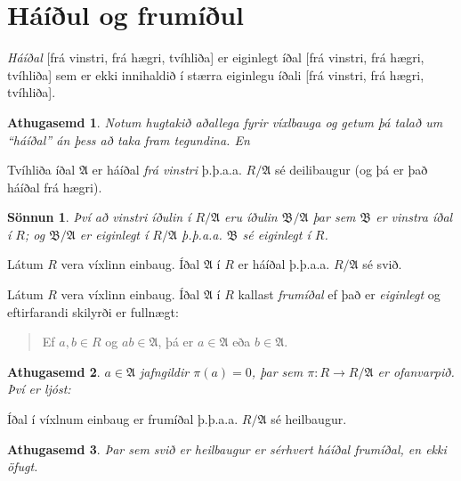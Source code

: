 \documentclass[a4paper,icelandic,11pt]{book}
\theoremstyle{plain}
\newtheorem*{ath}{Athugasemd}
\newtheorem*{sonnun}{Sönnun}
\begin{document}
\section{Háíðul og frumíðul}
\begin{skilgr}
  \emph{Háíðal}
  [frá vinstri, frá hægri, tvíhliða] er eiginlegt
  íðal [frá vinstri, frá hægri, tvíhliða] sem er ekki innihaldið í stærra
  eiginlegu íðali [frá vinstri, frá hægri, tvíhliða].
\end{skilgr}
\begin{ath}
  Notum hugtakið aðallega fyrir víxlbauga og getum þá talað um "`háíðal"' án
  þess að taka fram tegundina. En
\end{ath}
\begin{setn}
  Tvíhliða íðal $\mathfrak A$ er háíðal \emph{frá vinstri} þ.þ.a.a. $R/\mathfrak
  A$ sé deilibaugur (og þá er það háíðal frá hægri).
\end{setn}
\begin{sonnun}
  Því að vinstri íðulin í $R/\mathfrak A$ eru íðulin $\mathfrak B/\mathfrak A$
  þar sem $\mathfrak B$ er vinstra íðal í $R$; og $\mathfrak B/\mathfrak A$ er
  eiginlegt í $R /\mathfrak A$ þ.þ.a.a. $\mathfrak B$ sé eiginlegt í $R$.
\end{sonnun}
\begin{fylgisetn}
  Látum $R$ vera víxlinn einbaug. Íðal $\mathfrak A$ í $R$ er háíðal þ.þ.a.a.
  $R/\mathfrak A$ sé svið.
\end{fylgisetn}
\begin{skilgr}
  Látum $R$ vera víxlinn einbaug. Íðal $\mathfrak A$ í $R$ kallast
  \emph{frumíðal} ef það er
  \emph{eiginlegt} og eftirfarandi skilyrði er fullnægt:
  \begin{quote}
    Ef $a,b\in R$ og $ab \in \mathfrak A$, þá er $a \in \mathfrak A$ eða $b\in
    \mathfrak A$.
  \end{quote}
\end{skilgr}
\begin{ath}
  $a\in \mathfrak A$ jafngildir $\pi(a) = 0$, þar sem $\pi:R\to R/\mathfrak A$
  er ofanvarpið. Því er ljóst:
\end{ath}
\begin{setn}
  Íðal í víxlnum einbaug er frumíðal þ.þ.a.a. $R/\mathfrak A$ sé heilbaugur.
\end{setn}
\begin{ath}
  Þar sem svið er heilbaugur er sérhvert háíðal frumíðal, en ekki öfugt.
\end{ath}
\end{document}
